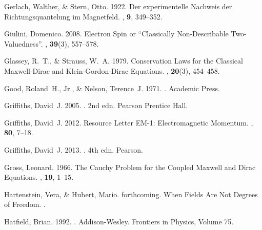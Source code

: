\documentclass[12pt,secnumarabic,amsmath,amssymb,balancelastpage,nofootinbib]{article}
\begin{document}
\begin{thebibliography}{}
Gerlach, Walther, \& Stern, Otto. 1922.
\newblock Der experimentelle Nachweis der Richtungsquantelung im Magnetfeld.
, {\bf 9}, 349--352.

Giulini, Domenico. 2008.
\newblock Electron Spin or ``Classically Non-Describable Two-Valuedness''.
, {\bf
  39}(3), 557--578.

Glassey, R.~T., \& Strauss, W.~A. 1979.
\newblock Conservation Laws for the Classical Maxwell-Dirac and
  Klein-Gordon-Dirac Equations.
, {\bf 20}(3), 454--458.

Good, Roland~H., Jr., \& Nelson, Terence~J. 1971.
.
\newblock Academic Press.

Griffiths, David~J. 2005.
. 2nd edn.
\newblock Pearson Prentice Hall.

Griffiths, David~J. 2012.
\newblock Resource Letter EM-1: Electromagnetic Momentum.
, {\bf 80}, 7--18.

Griffiths, David~J. 2013.
. 4th edn.
\newblock Pearson.

Gross, Leonard. 1966.
\newblock The Cauchy Problem for the Coupled Maxwell and Dirac Equations.
, {\bf 19},
  1--15.

Hartenstein, Vera, \& Hubert, Mario. forthcoming.
\newblock When Fields Are Not Degrees of Freedom.
.

Hatfield, Brian. 1992.
.
\newblock Addison-Wesley.
\newblock Frontiers in Physics, Volume 75.


\end{thebibliography}
\end{document}

